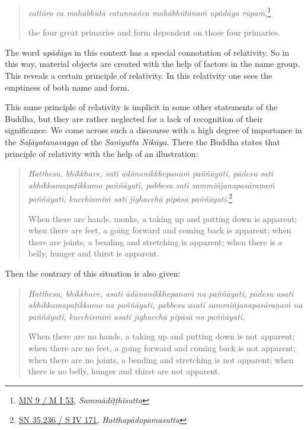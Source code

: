 \begin{quote}
\emph{cattāro ca mahābhūtā catunnañca mahābhūtānaṁ upādāya rūpaṁ,}\footnote{\href{https://suttacentral.net/mn9/pli/ms}{MN 9 / M I 53}, \emph{Sammādiṭṭhisutta}}

the four great primaries and form dependent on those four primaries.
\end{quote}

The word \emph{upādāya} in this context has a special connotation of relativity. So in this way, material objects are created with the help of factors in the name group. This reveals a certain principle of relativity. In this relativity one sees the emptiness of both name and form.

This same principle of relativity is implicit in some other statements of the Buddha, but they are rather neglected for a lack of recognition of their significance. We come across such a discourse with a high degree of importance in the \emph{Saḷāyatanavagga} of the \emph{Saṁyutta Nikāya}. There the Buddha states that principle of relativity with the help of an illustration:

\begin{quote}
\emph{Hatthesu, bhikkhave, sati ādānanikkhepanaṁ paññāyati, pādesu sati abhikkamapaṭikkamo paññāyati, pabbesu sati sammiñjanapasāraṇaṁ paññāyati, kucchismiṁ sati jighacchā pipāsā paññāyati.}\footnote{\href{https://suttacentral.net/sn35.236/pli/ms}{SN 35.236 / S IV 171}, \emph{Hatthapādopamasutta}}

When there are hands, monks, a taking up and putting down is apparent; when there are feet, a going forward and coming back is apparent; when there are joints, a bending and stretching is apparent; when there is a belly, hunger and thirst is apparent.
\end{quote}

Then the contrary of this situation is also given:

\begin{quote}
\emph{Hatthesu, bhikkhave, asati ādānanikkhepanaṁ na paññāyati, pādesu asati abhikkamapaṭikkamo na paññāyati, pabbesu asati sammiñjanapasāraṇaṁ na paññāyati, kucchismiṁ asati jighacchā pipāsā na paññāyati.}

When there are no hands, a taking up and putting down is not apparent; when there are no feet, a going forward and coming back is not apparent; when there are no joints, a bending and stretching is not apparent; when there is no belly, hunger and thirst are not apparent.
\end{quote}

